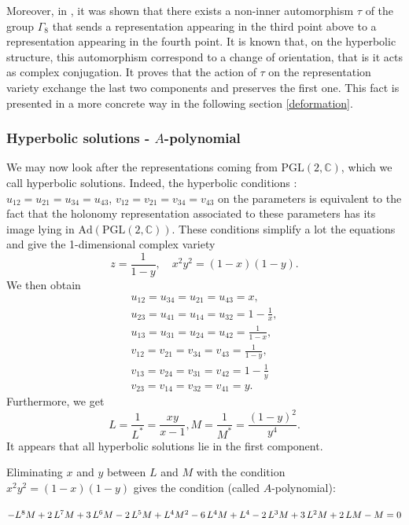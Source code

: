 Moreover, in {\cite{DF}}, it was shown that there exists a non-inner
automorphism $\tau$ of the group $\Gamma_{8}$ that sends a representation
appearing in the third point above to a representation appearing in the fourth point.
It is known that, on the hyperbolic structure, this automorphism
correspond to a change of orientation, that is it acts as complex conjugation. It proves that the action of $\tau$
on the representation variety exchange the last two components and preserves
the first one. This fact is presented in a more concrete way in the following section
\ref{deformation}.

\subsubsection{Hyperbolic solutions - $A$-polynomial}

We may now look after the representations coming from $\mathrm{PGL}
(2,\mathbb{C})$, which we call hyperbolic solutions. Indeed, the hyperbolic
conditions : $u_{12} =u_{21} =u_{34} =u_{43}$, $v_{12} =v_{21} =v_{34}
=v_{43}$ on the parameters is equivalent to the fact that the holonomy
representation associated to these parameters has its image lying in
$\mathrm{Ad} ( \mathrm{PGL} (2,\mathbb{C}))$. These conditions simplify a lot
the equations and give the 1-dimensional complex variety
\[ z= \frac{1}{1-y} , \hspace{1em} x^{2} y^{2} = (1-x)  (1-y) . \]
We then obtain
\[ \begin{array}{l}
     u_{12} =u_{34} =u_{21} =u_{43} =x,\\
     u_{23} =u_{41} =u_{14} =u_{32} =1- \frac{1}{x} ,\\
     u_{13} =u_{31} =u_{24} =u_{42} = \frac{1}{1-x} ,\\
     v_{12} =v_{21} =v_{34} =v_{43} = \frac{1}{1-y} ,\\
     v_{13} =v_{24} =v_{31} =v_{42} =1- \frac{1}{y}\\
     v_{23} =v_{14} =v_{32} =v_{41} =y.
   \end{array} \]
Furthermore, we get
\[ L= \frac{1}{L^{\ast}} = \frac{xy}{x-1} ,M= \frac{1}{M^{\ast}} =
   \frac{(1-y)^{2}}{y^{4}} . \]
It appears that all hyperbolic solutions lie in the first component.

Eliminating $x$ and $y$ between $L$ and $M$ with the condition $x^{2} y^{2} =
(1-x)  (1-y)$ gives the condition (called $A$-polynomial):

{\small{$-L^{8} M+2 \hspace{0.17em} L^{7} M+3 \hspace{0.17em} L^{6} M-2
\hspace{0.17em} L^{5} M+L^{4} M^{2} -6 \hspace{0.17em} L^{4} M+L^{4} -2
\hspace{0.17em} L^{3} M+3 \hspace{0.17em} L^{2} M+2 \hspace{0.17em} LM-M=0$}}

